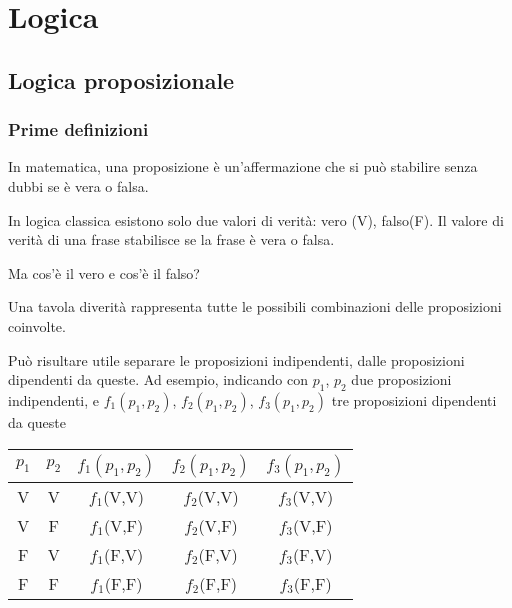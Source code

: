 
\chapter{Logica}

\section{Logica proposizionale}
\subsection{Prime definizioni}
\begin{definition}[Proposizione] In matematica, una proposizione è un'affermazione che si può stabilire senza dubbi se è vera o falsa.
\end{definition}
\begin{definition} In logica classica esistono solo due valori di verità: vero (V), falso(F). Il valore di verità di una frase stabilisce se la frase è vera o falsa.
\end{definition}
%
{\color{red} Ma cos'è il vero e cos'è il falso?}
%
\begin{definition} Una tavola diverità rappresenta tutte le possibili combinazioni delle proposizioni coinvolte.
\end{definition}
\begin{example} Può risultare utile separare le proposizioni indipendenti, dalle proposizioni dipendenti da queste. Ad esempio, indicando con $p_1$, $p_2$ due proposizioni indipendenti, e $f_1(p_1,p_2)$,  $f_2(p_1,p_2)$, $f_3(p_1,p_2)$ tre proposizioni dipendenti da queste
\begin{center}
\begin{tabular}{|c|c||c|c|c|}
  \hline
  $p_1$ & $p_2$ & $f_1(p_1,p_2)$ & $f_2(p_1,p_2)$ & $f_3(p_1,p_2)$ \\
  \hline
  V & V & $f_1$(V,V) & $f_2$(V,V) & $f_3$(V,V) \\
  V & F & $f_1$(V,F) & $f_2$(V,F) & $f_3$(V,F) \\
  F & V & $f_1$(F,V) & $f_2$(F,V) & $f_3$(F,V) \\
  F & F & $f_1$(F,F) & $f_2$(F,F) & $f_3$(F,F) \\
  \hline
\end{tabular}
\end{center}
\end{example}

